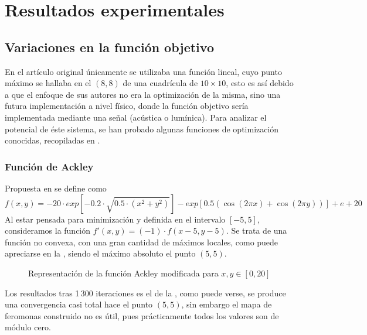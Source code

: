 	\section{Resultados experimentales}
	\label{sec:resultados}
	
	
	
	
	\subsection{Variaciones en la función objetivo}
	En el artículo original \cite{initialPaper} únicamente se utilizaba una función lineal, cuyo punto máximo se hallaba en el $(8,8)$ de una cuadrícula de $10\times10$, esto es así debido a que el enfoque de sus autores no era la optimización de la misma, sino una futura implementación a nivel físico, donde la función objetivo sería implementada mediante una señal (acústica o lumínica). Para analizar el potencial de éste sistema, se han probado algunas funciones de optimización conocidas, recopiladas en \cite{WebFuncionesOptimizacion}.
	
	\subsubsection{Función de Ackley} Propuesta en \cite{AckleyFunction} se define como
	\[ f(x,y)=-20 \cdot exp[-0.2 \cdot \sqrt{0.5 \cdot (x^2 + y^2)}] - exp[0.5 ( \cos(2 \pi x)
	+ \cos(2 \pi y))] + e + 20\]
	Al estar pensada para minimización y definida en el intervalo $[-5,5]$, consideramos la función $f'(x,y)=(-1)\cdot f(x-5, y-5)$. Se trata de una función no convexa, con una gran cantidad de máximos locales, como puede apreciarse en la , siendo el máximo absoluto el punto $(5,5)$.
	
	\begin{figure}[htbp]
	    \centering
	    \caption{Representación de la función Ackley modificada para $x,y\in[0,20]$}
	    \label{fig:2}
	\end{figure}
	
	Los resultados tras 1\,300 iteraciones es el de la , como puede verse, se produce una convergencia casi total hace el punto $(5,5)$, sin embargo el mapa de feromonas construido no es útil, pues prácticamente todos los valores son de módulo cero.
	
